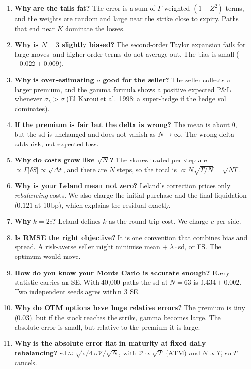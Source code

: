 \documentclass[10.5pt,a4paper]{article}
\begin{document}
\begin{enumerate}[label=\textbf{Q\arabic*.},leftmargin=2.2em]
\item \textbf{Why are the tails fat?} The error is a sum of $\Gamma$-weighted $(1-Z^2)$ terms, and the weights are random and large near the strike close to expiry. Paths that end near $K$ dominate the losses.
\item \textbf{Why is $N=3$ slightly biased?} The second-order Taylor expansion fails for large moves, and higher-order terms do not average out. The bias is small ($-0.022\pm0.009$).
\item \textbf{Why is over-estimating $\sigma$ good for the seller?} The seller collects a larger premium, and the gamma formula shows a positive expected P\&L whenever $\sigma_h>\sigma$ (El Karoui et al.\ 1998: a super-hedge if the hedge vol dominates).
\item \textbf{If the premium is fair but the delta is wrong?} The mean is about 0, but the sd is unchanged and does not vanish as $N\to\infty$. The wrong delta adds risk, not expected loss.
\item \textbf{Why do costs grow like $\sqrt N$?} The shares traded per step are $\propto\Gamma|\delta S|\propto\sqrt{\Delta t}$, and there are $N$ steps, so the total is $\propto N\sqrt{T/N}=\sqrt{NT}$.
\item \textbf{Why is your Leland mean not zero?} Leland's correction prices only \emph{rebalancing} costs. We also charge the initial purchase and the final liquidation ($0.121$ at 10\,bp), which explains the residual exactly.
\item \textbf{Why $k=2c$?} Leland defines $k$ as the round-trip cost. We charge $c$ per side.
\item \textbf{Is RMSE the right objective?} It is one convention that combines bias and spread. A risk-averse seller might minimise mean + $\lambda\cdot$sd, or ES. The optimum would move.
\item \textbf{How do you know your Monte Carlo is accurate enough?} Every statistic carries an SE. With 40{,}000 paths the sd at $N=63$ is $0.434\pm0.002$. Two independent seeds agree within 3 SE.
\item \textbf{Why do OTM options have huge relative errors?} The premium is tiny (0.03), but if the stock reaches the strike, gamma becomes large. The absolute error is small, but relative to the premium it is large.
\item \textbf{Why is the absolute error flat in maturity at fixed daily rebalancing?} $\mathrm{sd}\approx\sqrt{\pi/4}\,\sigma\mathcal V/\sqrt N$, with $\mathcal V\propto\sqrt T$ (ATM) and $N\propto T$, so $T$ cancels.

\end{enumerate}
\end{document}
